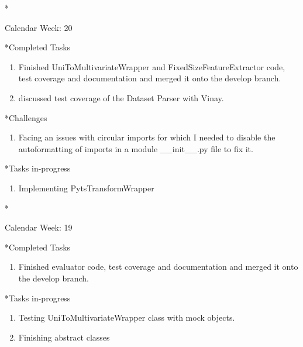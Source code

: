 \documentclass[11pt,a4paper]{article}
\begin{document}
\newpage
\begin{section}*{Calendar Week: 20 \hfill \date{20 May, 2021}}
	
	\begin{subsection}*{Completed Tasks}
		\begin{enumerate}
			\item Finished UniToMultivariateWrapper and FixedSizeFeatureExtractor code, test coverage and documentation and merged it onto the develop branch.
			\item discussed test coverage of the Dataset Parser with Vinay.
		\end{enumerate}
	\end{subsection}
	
	\begin{subsection}*{Challenges}
		\begin{enumerate}
			\item Facing an issues with circular imports for which I needed to disable the autoformatting of imports in a module \_\_init\_\_.py file to fix it.
		\end{enumerate}
	\end{subsection}
	
	\begin{subsection}*{Tasks in-progress}
		\begin{enumerate}
			\item Implementing PytsTransformWrapper
		\end{enumerate}
	\end{subsection}
	
\end{section}

\newpage
\begin{section}*{Calendar Week: 19 \hfill \date{14 May, 2021}}
	
	\begin{subsection}*{Completed Tasks}
		\begin{enumerate}
			\item Finished evaluator code, test coverage and documentation and merged it onto the develop branch.
		\end{enumerate}
	\end{subsection}
	
	\begin{subsection}*{Tasks in-progress}
		\begin{enumerate}
			\item Testing UniToMultivariateWrapper class with mock objects.
			\item Finishing abstract classes
		\end{enumerate}
	\end{subsection}
	
\end{section}
\end{document}
